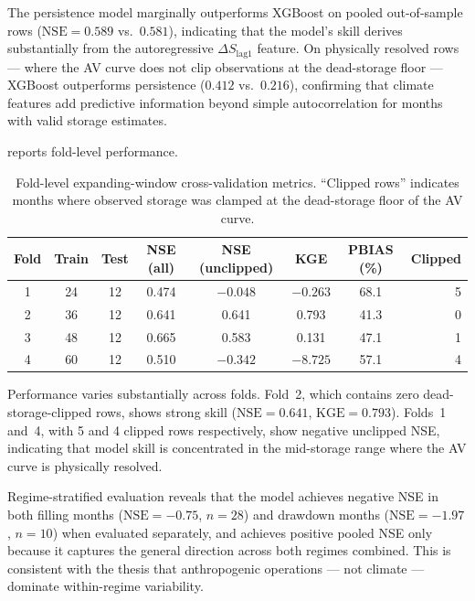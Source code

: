 \documentclass[preprint,12pt,authoryear]{elsarticle}
\newcommand{\dS}{\Delta S}
\newcommand{\NSE}{\mathrm{NSE}}
\newcommand{\KGE}{\mathrm{KGE}}
\begin{document}
The persistence model marginally outperforms XGBoost on pooled out-of-sample
rows ($\NSE = 0.589$ vs.\ $0.581$), indicating that the model's skill derives
substantially from the autoregressive $\dS_{\text{lag1}}$ feature. On
physically resolved rows --- where the AV curve does not clip observations at
the dead-storage floor --- XGBoost outperforms persistence ($0.412$ vs.\
$0.216$), confirming that climate features add predictive information beyond
simple autocorrelation for months with valid storage estimates.

 reports fold-level performance.

\begin{table}[htbp]
  \centering
  \caption{Fold-level expanding-window cross-validation metrics.
           ``Clipped rows'' indicates months where observed storage was
           clamped at the dead-storage floor of the AV curve.}
  \label{tab:foldmetrics}
  \begin{tabular}{cccccccr}
    \toprule
    Fold & Train & Test & NSE (all) & NSE (unclipped) & KGE & PBIAS (\%) & Clipped \\
    \midrule
    1 & 24 & 12 & 0.474 & $-0.048$ & $-0.263$ & 68.1 & 5 \\
    2 & 36 & 12 & 0.641 &   0.641  &   0.793  & 41.3 & 0 \\
    3 & 48 & 12 & 0.665 &   0.583  &   0.131  & 47.1 & 1 \\
    4 & 60 & 12 & 0.510 & $-0.342$ & $-8.725$ & 57.1 & 4 \\
    \bottomrule
  \end{tabular}

  \smallskip

  {\footnotesize Performance varies substantially across folds. Fold~2, which
  contains zero dead-storage-clipped rows, shows strong skill ($\NSE = 0.641$,
  $\KGE = 0.793$). Folds~1 and~4, with 5 and 4 clipped rows respectively, show
  negative unclipped NSE, indicating that model skill is concentrated in the
  mid-storage range where the AV curve is physically resolved.}
\end{table}

Regime-stratified evaluation reveals that the model achieves negative NSE in
both filling months ($\NSE = -0.75$, $n = 28$) and drawdown months
($\NSE = -1.97$, $n = 10$) when evaluated separately, and achieves positive
pooled NSE only because it captures the general direction across both regimes
combined. This is consistent with the thesis that anthropogenic operations ---
not climate --- dominate within-regime variability.
\end{document}
